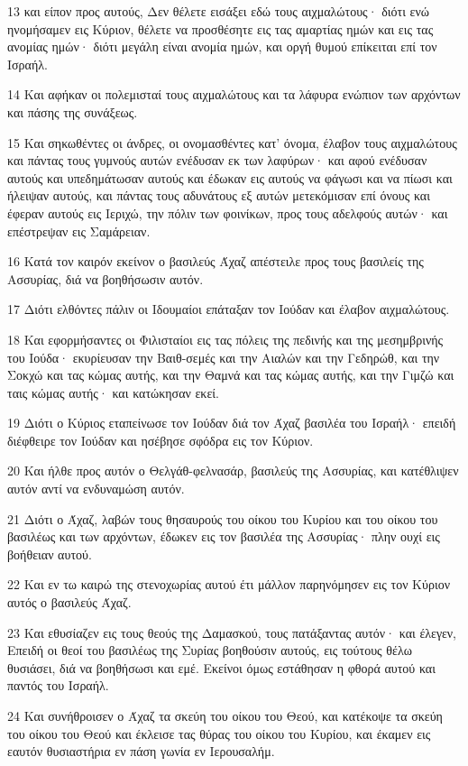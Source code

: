 \par 13 και είπον προς αυτούς, Δεν θέλετε εισάξει εδώ τους αιχμαλώτους· διότι ενώ ηνομήσαμεν εις Κύριον, θέλετε να προσθέσητε εις τας αμαρτίας ημών και εις τας ανομίας ημών· διότι μεγάλη είναι ανομία ημών, και οργή θυμού επίκειται επί τον Ισραήλ.
\par 14 Και αφήκαν οι πολεμισταί τους αιχμαλώτους και τα λάφυρα ενώπιον των αρχόντων και πάσης της συνάξεως.
\par 15 Και σηκωθέντες οι άνδρες, οι ονομασθέντες κατ' όνομα, έλαβον τους αιχμαλώτους και πάντας τους γυμνούς αυτών ενέδυσαν εκ των λαφύρων· και αφού ενέδυσαν αυτούς και υπεδημάτωσαν αυτούς και έδωκαν εις αυτούς να φάγωσι και να πίωσι και ήλειψαν αυτούς, και πάντας τους αδυνάτους εξ αυτών μετεκόμισαν επί όνους και έφεραν αυτούς εις Ιεριχώ, την πόλιν των φοινίκων, προς τους αδελφούς αυτών· και επέστρεψαν εις Σαμάρειαν.
\par 16 Κατά τον καιρόν εκείνον ο βασιλεύς Άχαζ απέστειλε προς τους βασιλείς της Ασσυρίας, διά να βοηθήσωσιν αυτόν.
\par 17 Διότι ελθόντες πάλιν οι Ιδουμαίοι επάταξαν τον Ιούδαν και έλαβον αιχμαλώτους.
\par 18 Και εφορμήσαντες οι Φιλισταίοι εις τας πόλεις της πεδινής και της μεσημβρινής του Ιούδα· εκυρίευσαν την Βαιθ-σεμές και την Αιαλών και την Γεδηρώθ, και την Σοκχώ και τας κώμας αυτής, και την Θαμνά και τας κώμας αυτής, και την Γιμζώ και ταις κώμας αυτής· και κατώκησαν εκεί.
\par 19 Διότι ο Κύριος εταπείνωσε τον Ιούδαν διά τον Άχαζ βασιλέα του Ισραήλ· επειδή διέφθειρε τον Ιούδαν και ησέβησε σφόδρα εις τον Κύριον.
\par 20 Και ήλθε προς αυτόν ο Θελγάθ-φελνασάρ, βασιλεύς της Ασσυρίας, και κατέθλιψεν αυτόν αντί να ενδυναμώση αυτόν.
\par 21 Διότι ο Άχαζ, λαβών τους θησαυρούς του οίκου του Κυρίου και του οίκου του βασιλέως και των αρχόντων, έδωκεν εις τον βασιλέα της Ασσυρίας· πλην ουχί εις βοήθειαν αυτού.
\par 22 Και εν τω καιρώ της στενοχωρίας αυτού έτι μάλλον παρηνόμησεν εις τον Κύριον αυτός ο βασιλεύς Άχαζ.
\par 23 Και εθυσίαζεν εις τους θεούς της Δαμασκού, τους πατάξαντας αυτόν· και έλεγεν, Επειδή οι θεοί του βασιλέως της Συρίας βοηθούσιν αυτούς, εις τούτους θέλω θυσιάσει, διά να βοηθήσωσι και εμέ. Εκείνοι όμως εστάθησαν η φθορά αυτού και παντός του Ισραήλ.
\par 24 Και συνήθροισεν ο Άχαζ τα σκεύη του οίκου του Θεού, και κατέκοψε τα σκεύη του οίκου του Θεού και έκλεισε τας θύρας του οίκου του Κυρίου, και έκαμεν εις εαυτόν θυσιαστήρια εν πάση γωνία εν Ιερουσαλήμ.
